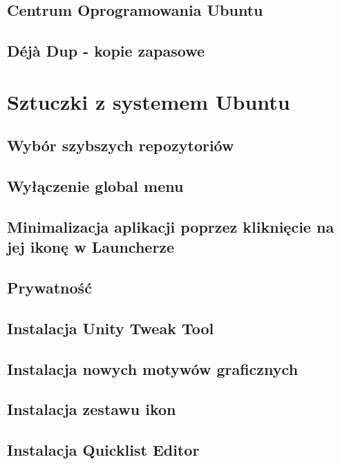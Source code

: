 \documentclass[a4paper,11pt,oneside]{mwart}
\begin{document}
		\subsection{Centrum Oprogramowania Ubuntu}
			
		\subsection{Déjà Dup - kopie zapasowe}
			
	\section{Sztuczki z systemem Ubuntu}
		
		\subsection{Wybór szybszych repozytoriów}
			
		\subsection{Wyłączenie global menu}
			
		\subsection{Minimalizacja aplikacji poprzez kliknięcie na jej ikonę w Launcherze}
			
		\subsection{Prywatność}
			
		\subsection{Instalacja Unity Tweak Tool}
			
		\subsection{Instalacja nowych motywów graficznych}
			
		\subsection{Instalacja zestawu ikon}
			
		\subsection{Instalacja Quicklist Editor}
			
\end{document}
